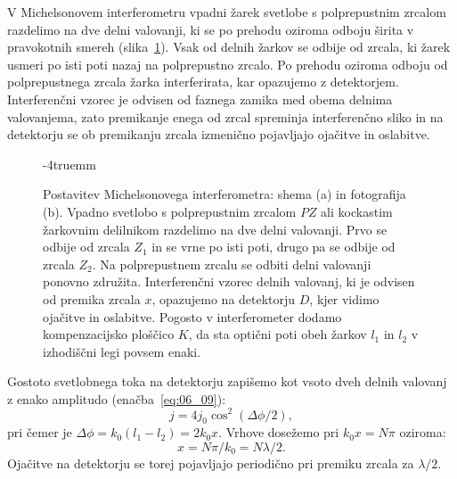 V Michelsonovem interferometru vpadni žarek svetlobe s polprepustnim zrcalom razdelimo 
na dve delni valovanji, ki se po prehodu oziroma odboju širita v pravokotnih 
smereh (slika~\ref{fig:06_Michelson}). Vsak od delnih žarkov se odbije od zrcala, 
ki žarek usmeri po isti poti nazaj na polprepustno zrcalo. Po prehodu oziroma odboju
od polprepustnega zrcala žarka interferirata, kar opazujemo z detektorjem. 
Interferenčni vzorec je odvisen od faznega zamika med obema delnima valovanjema, 
zato premikanje enega od zrcal spreminja interferenčno sliko in na detektorju 
se ob premikanju zrcala izmenično pojavljajo ojačitve in oslabitve.
\begin{figure}[ht]
\centering
\def\svgwidth{130truemm} 

\caption{Postavitev Michelsonovega interferometra: shema (a) in fotografija (b). 
Vpadno svetlobo s polprepustnim zrcalom $PZ$ ali kockastim žarkovnim 
delilnikom razdelimo na dve delni valovanji. 
Prvo se odbije od zrcala $Z_1$ in se vrne po isti poti, drugo pa se odbije od 
zrcala $Z_2$. Na polprepustnem zrcalu se odbiti delni valovanji 
ponovno združita. Interferenčni vzorec delnih valovanj, ki je odvisen
od premika zrcala $x$, opazujemo na detektorju $D$, kjer vidimo ojačitve
in oslabitve. Pogosto v interferometer dodamo kompenzacijsko
ploščico $K$, da sta optični poti obeh žarkov $l_1$ in $l_2$ v izhodiščni 
legi povsem enaki. 
}
\label{fig:06_Michelson}
\vglue-4truemm
\end{figure}

Gostoto svetlobnega toka na detektorju zapišemo kot vsoto 
dveh delnih valovanj z enako amplitudo (enačba~\ref{eq:06_09}):
\begin{equation}
j = 4j_0 \cos^2(\Delta \phi/2),
\label{eq:06_24}
\end{equation}
pri čemer je $\Delta \phi = k_0(l_1-l_2) = 2 k_0 x$. Vrhove dosežemo pri 
$k_0 x = N \pi$ oziroma:
\begin{equation}
x = N\pi/k_0 = N\lambda/2.
\label{eq:06_25}
\end{equation}
Ojačitve na detektorju se torej pojavljajo periodično pri premiku zrcala za $\lambda/2$. 

